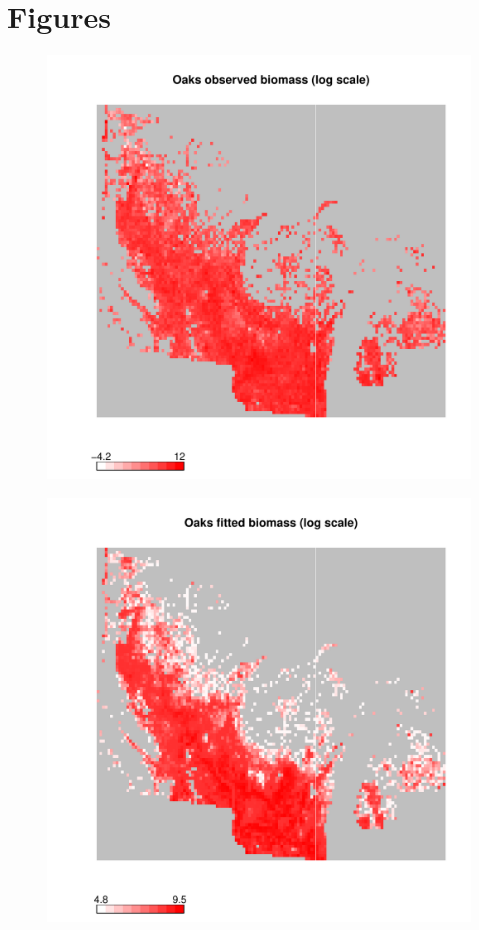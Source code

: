 \documentclass[authoryear, review, 11pt]{elsarticle}
\begin{document}
\section{Figures}
\begin{figure}
	\begin{center}
	\includegraphics[width=5in]{../../figures//Oaks-biomass-observed.pdf}
	\caption{\label{fig:oaks-biomass-observed}}
	\end{center}
\end{figure}

\begin{figure}
	\begin{center}
	\includegraphics[width=5in]{../../figures/Oaks-biomass-fitted.pdf}
	\caption{\label{fig:oaks-biomass-fitted}}
	\end{center}
\end{figure}
\end{document}

